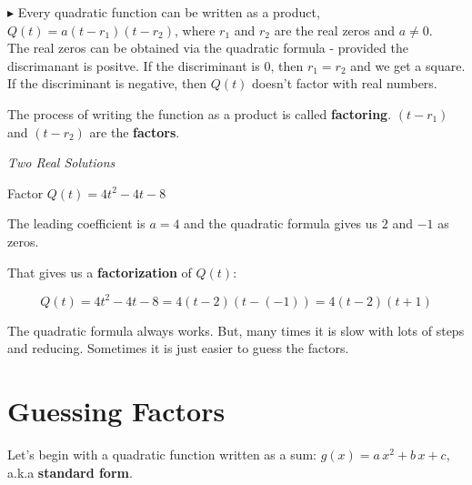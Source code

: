 \documentclass{ximera}
\begin{document}
$\blacktriangleright$ Every quadratic function can be written as a product, $Q(t) = a (t - r_1)(t - r_2)$, where $r_1$ and $r_2$ are the real zeros and $a \ne 0$. \\





The real zeros can be obtained via the quadratic formula - provided the discrimanant is positve.  If the discriminant is $0$, then $r_1 = r_2$ and we get a square.  If the discriminant is negative, then $Q(t)$ doesn't factor with real numbers.  


The process of writing the function as a product is called \textbf{factoring}. $(t - r_1)$  and $(t - r_2)$ are the \textbf{factors}.



\begin{example} \textit{Two Real Solutions} 

Factor $Q(t) = 4 t^2 - 4 t - 8$ 

\begin{explanation}

The leading coefficient is $a=4$ and the quadratic formula gives us $2$ and $-1$ as zeros.  

That gives us a \textbf{factorization} of $Q(t)$:



\[    Q(t) = 4 t^2 - 4 t - 8 =  4 (t-2)(t-(-1))    = 4 (t-2)(t+1)         \]

\end{explanation}

\end{example}



The quadratic formula always works.  But, many times it is slow with lots of steps and reducing.  Sometimes it is just easier to guess the factors.




















\section{Guessing Factors}


Let's begin with a quadratic function written as a sum: $g(x) = a \, x^2 + b \, x + c$, a.k.a \textbf{standard form}.  
\end{document}
